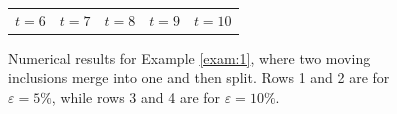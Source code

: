 \documentclass[onefignum,onetabnum]{siamart190516}
\numberwithin{equation}{section}
\begin{document}
\begin{figure}[hbt!]
\begin{tabular}{ccccc}
$t=6$ & $t=7$ & $t=8$ & $t=9$ & $t=10$
\end{tabular}
\caption{
Numerical results for Example \ref{exam:1}, where two moving inclusions merge into one and then split.
Rows 1 and 2 are for $\varepsilon = 5\%$, while rows 3 and 4 are for $\varepsilon = 10\%$.
\label{fig1}}
\end{figure}
\end{document}
